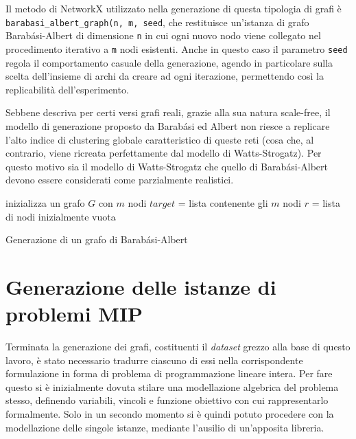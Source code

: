 Il metodo di NetworkX utilizzato nella generazione di questa tipologia di grafi è\\
\texttt{barabasi\_albert\_graph(n, m, seed}, che restituisce un'istanza di grafo Barabási-Albert di dimensione \texttt{n} in cui ogni nuovo nodo viene collegato nel procedimento iterativo a \texttt{m} nodi esistenti. Anche in questo caso il parametro \texttt{seed} regola il comportamento casuale della generazione, agendo in particolare sulla scelta dell'insieme di archi da creare ad ogni iterazione, permettendo così la replicabilità dell'esperimento. 

Sebbene descriva per certi versi grafi reali, grazie alla sua natura scale-free, il modello di generazione proposto da Barabási ed Albert non riesce a replicare l'alto indice di clustering globale caratteristico di queste reti (cosa che, al contrario, viene ricreata perfettamente dal modello di Watts-Strogatz). Per questo motivo sia il modello di Watts-Strogatz che quello di Barabási-Albert devono essere considerati come parzialmente realistici.

\begin{algorithm}
\SetAlgoLined
{}
 inizializza un grafo $G$ con $m$ nodi\;
 $target$ = lista contenente gli $m$ nodi\;
 $r$ = lista di nodi inizialmente vuota\;
 \caption{Generazione di un grafo di Barabási-Albert}
 \label{alg:bag}
\end{algorithm}

\newpage
\section{Generazione delle istanze di problemi MIP}
Terminata la generazione dei grafi, costituenti il \textit{dataset} grezzo alla base di questo lavoro, è stato necessario tradurre ciascuno di essi nella corrispondente formulazione in forma di problema di programmazione lineare intera. Per fare questo si è inizialmente dovuta stilare una modellazione algebrica del problema stesso, definendo variabili, vincoli e funzione obiettivo con cui rappresentarlo formalmente. Solo in un secondo momento si è quindi potuto procedere con la modellazione delle singole istanze, mediante l'ausilio di un'apposita libreria.

